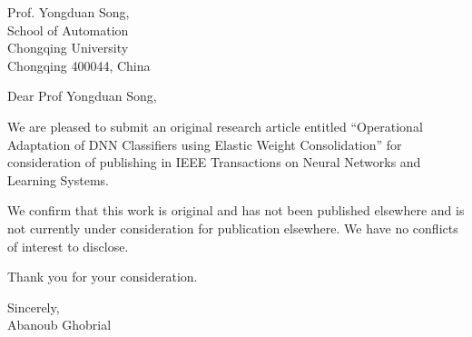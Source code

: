 \documentclass[11pt, a4paper]{letter} %
\begin{document}

\begin{letter}{
	Prof. Yongduan Song,\\
	School of Automation\\
	Chongqing University\\
	Chongqing 400044, China\\
}


\opening{Dear Prof Yongduan Song,}

\noindent We are pleased to submit an original research article entitled “Operational Adaptation of DNN Classifiers using Elastic Weight Consolidation” for consideration of publishing in IEEE Transactions on Neural Networks and Learning Systems. 

\noindent We confirm that this work is original and has not been published elsewhere and is not currently under consideration for publication elsewhere. We have no conflicts of interest to disclose. 

\noindent Thank you for your consideration. 

\noindent Sincerely,\\


\noindent Abanoub Ghobrial





\end{letter}
\end{document}
